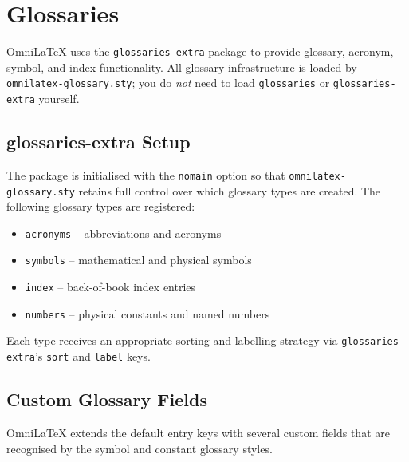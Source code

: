 \chapter{Glossaries}
\label{ch:glossaries}

OmniLaTeX uses the \texttt{glossaries-extra} package to provide glossary,
acronym, symbol, and index functionality.  All glossary infrastructure is
loaded by \texttt{omnilatex-glossary.sty}; you do \emph{not} need to load
\texttt{glossaries} or \texttt{glossaries-extra} yourself.

\section{glossaries-extra Setup}

The package is initialised with the \texttt{nomain} option so that
\texttt{omnilatex-glossary.sty} retains full control over which glossary
types are created.  The following glossary types are registered:

\begin{itemize}
    \item \texttt{acronyms} -- abbreviations and acronyms
    \item \texttt{symbols} -- mathematical and physical symbols
    \item \texttt{index} -- back-of-book index entries
    \item \texttt{numbers} -- physical constants and named numbers
\end{itemize}

Each type receives an appropriate sorting and labelling strategy via
\texttt{glossaries-extra}'s \texttt{sort} and \texttt{label} keys.

\section{Custom Glossary Fields}

OmniLaTeX extends the default entry keys with several custom fields that
are recognised by the symbol and constant glossary styles.

